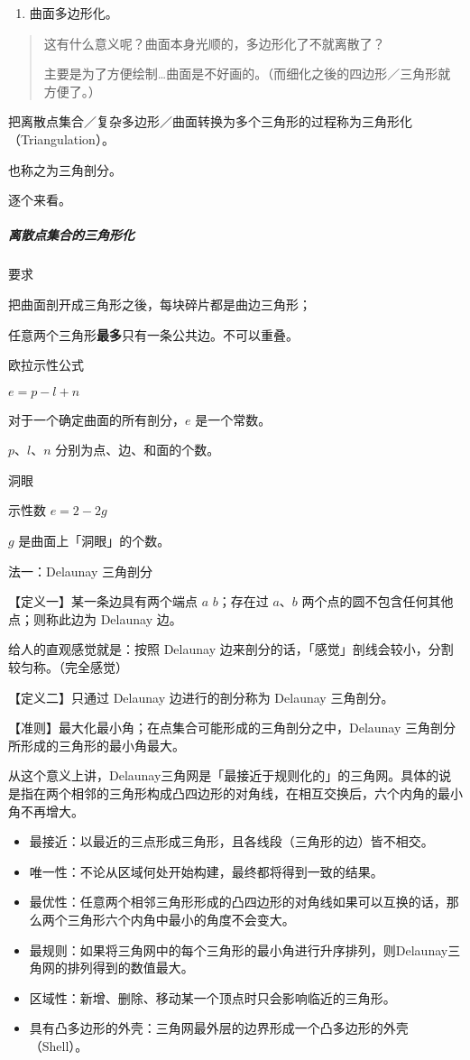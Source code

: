 \documentclass[
]{article}
\begin{document}
\begin{enumerate}
\def\labelenumi{\arabic{enumi}.}
\item
  曲面多边形化。
\end{enumerate}

\begin{quote}
这有什么意义呢？曲面本身光顺的，多边形化了不就离散了？

主要是为了方便绘制\ldots 曲面是不好画的。（而细化之後的四边形／三角形就方便了。）
\end{quote}

把离散点集合／复杂多边形／曲面转换为多个三角形的过程称为三角形化（Triangulation）。

也称之为三角剖分。

逐个来看。

\hypertarget{header-n36}{%
\subparagraph{离散点集合的三角形化}\label{header-n36}}

要求

把曲面剖开成三角形之後，每块碎片都是曲边三角形；

任意两个三角形\textbf{最多}只有一条公共边。不可以重叠。

欧拉示性公式

\(e = p - l + n\)

对于一个确定曲面的所有剖分，\(e\) 是一个常数。

\(p\)、\(l\)、\(n\) 分别为点、边、和面的个数。

洞眼

示性数 \(e = 2 - 2g\)

\(g\) 是曲面上「洞眼」的个数。

法一：Delaunay 三角剖分

【定义一】某一条边具有两个端点 \(a\) \(b\)；存在过 \(a\)、\(b\)
两个点的圆不包含任何其他点；则称此边为 Delaunay 边。

给人的直观感觉就是：按照 Delaunay
边来剖分的话，「感觉」剖线会较小，分割较匀称。（完全感觉）

【定义二】只通过 Delaunay 边进行的剖分称为 Delaunay 三角剖分。

【准则】最大化最小角；在点集合可能形成的三角剖分之中，Delaunay
三角剖分所形成的三角形的最小角最大。

从这个意义上讲，Delaunay三角网是「最接近于规则化的」的三角网。具体的说是指在两个相邻的三角形构成凸四边形的对角线，在相互交换后，六个内角的最小角不再增大。

\begin{itemize}
\item
  最接近：以最近的三点形成三角形，且各线段（三角形的边）皆不相交。
\item
  唯一性：不论从区域何处开始构建，最终都将得到一致的结果。
\item
  最优性：任意两个相邻三角形形成的凸四边形的对角线如果可以互换的话，那么两个三角形六个内角中最小的角度不会变大。
\item
  最规则：如果将三角网中的每个三角形的最小角进行升序排列，则Delaunay三角网的排列得到的数值最大。
\item
  区域性：新增、删除、移动某一个顶点时只会影响临近的三角形。
\item
  具有凸多边形的外壳：三角网最外层的边界形成一个凸多边形的外壳（Shell）。
\end{itemize}
\end{document}
